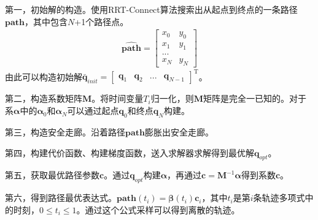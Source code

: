 \documentclass[master,academic]{ysuthesis} %
\begin{document}
		第一，初始解的构造。使用RRT-Connect算法搜索出从起点到终点的一条路径$\bm{\hat{path}}$，其中包含$N$+1个路径点。
		\begin{equation}
			\begin{aligned}
				\bm{\hat{path}} = \begin{bmatrix}
					x_0 &y_0\\
					x_1&y_1\\
					...\\
					x_N& y_N
				\end{bmatrix} 
			\end{aligned}
		\end{equation}
		由此可以构造初始解$\bm{\bar{q}}_{init}
		=\begin{bmatrix}
			\bm{q}_1& \bm{q}_2& ...&\bm{q}_{N-1}
		\end{bmatrix}^{\mathrm{T}}$。

		第二，构造系数矩阵$\bm{M}$。将时间变量$T_i$归一化，则$\bm{M}$矩阵是完全一已知的。对于系$\bm{\alpha}$中的$\bm{\alpha}_0$和$\bm{\alpha}_N$可以通过起点$\bm{q}_0$和终点$\bm{q}_N$构建。
		
		第三，构造安全走廊。沿着路径$\bm{\hat{path}}$膨胀出安全走廊。

		第四，构建代价函数、构建梯度函数，送入求解器求解得到最优解$\bm{q}_{opt}$。

		第五，获取最优路径参数$\bm{c}$。通过$\bm{q}_{opt}$构建$\bm{\alpha}$，再通过$\bm{c} = \bm{M}^{-1}\bm{\alpha}$得到系数$\bm{c}$。

		第六，得到路径最优表达式。$\bm{path}(t_i)=\bm{\beta}(t_i)\bm{c}_i$，其中$t_i$是第$i$条轨迹多项式中的时刻，$0 \le t_i \le 1$。通过这个公式采样可以得到离散的轨迹。
		
		
\end{document}
